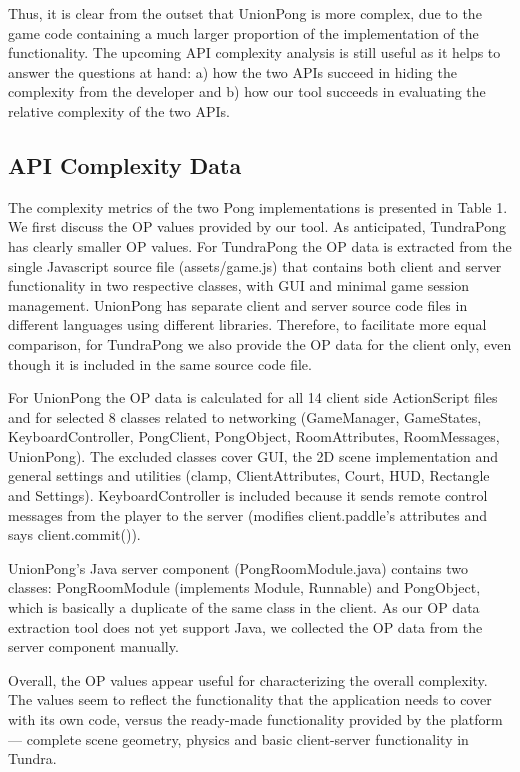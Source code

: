 \documentclass[conference]{IEEEtran}
\begin{document}

Thus, it is clear from the outset that UnionPong is more complex, due
to the game code containing a much larger proportion of the
implementation of the functionality. The upcoming API complexity
analysis is still useful as it helps to answer the questions at hand:
a) how the two APIs succeed in hiding the complexity from the
developer and b) how our tool succeeds in evaluating the relative
complexity of the two APIs.

\subsection{API Complexity Data}

The complexity metrics of the two Pong implementations is presented in
Table 1. We first discuss the OP values provided by our tool. As
anticipated, TundraPong has clearly smaller OP values. For TundraPong
the OP data is extracted from the single Javascript source file
(assets/game.js) that contains both client and server functionality in
two respective classes, with GUI and minimal game session
management. UnionPong has separate client and server source code files
in different languages using different libraries. Therefore, to
facilitate more equal comparison, for TundraPong we also provide the
OP data for the client only, even though it is included in the same
source code file.

For UnionPong the OP data is calculated for all 14 client side
ActionScript files and for selected 8 classes related to networking
(GameManager, GameStates, KeyboardController, PongClient, PongObject,
RoomAttributes, RoomMessages, UnionPong). The excluded classes cover
GUI, the 2D scene implementation and general settings and utilities
(clamp, ClientAttributes, Court, HUD, Rectangle and
Settings). KeyboardController is included because it sends remote
control messages from the player to the server (modifies
client.paddle’s attributes and says client.commit()).

UnionPong’s Java server component (PongRoomModule.java) contains two
classes: PongRoomModule (implements Module, Runnable) and PongObject,
which is basically a duplicate of the same class in the client. As our
OP data extraction tool does not yet support Java, we collected the OP
data from the server component manually.

Overall, the OP values appear useful for characterizing the overall
complexity. The values seem to reflect the functionality that the
application needs to cover with its own code, versus the ready-made
functionality provided by the platform --- complete scene geometry,
physics and basic client-server functionality in Tundra.
\end{document}
